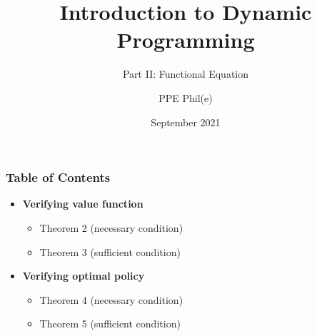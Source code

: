 \documentclass[aspectratio=169]{beamer}
\title[Dynamic Programming Part II] %
{Introduction to Dynamic Programming}
\subtitle{Part II: Functional Equation}
\author[PPE Phil(e)]
{PPE Phil(e)\inst{1}}
\institute[] %
{
  \inst{1}%
  material @ https://github.com/PPEphile
}
\date[2021] %
{September 2021}
\begin{document}
\frame{\titlepage}

\begin{frame}
\frametitle{Table of Contents}
\begin{itemize}
\item \textbf{Verifying \color{magenta} value function}
\begin{itemize}
\item \color{black} Theorem 2 (necessary condition)
\item Theorem 3 (sufficient condition)
\end{itemize}
\item \textbf{Verifying \color{blue}optimal policy}
\begin{itemize}
\item \color{black} Theorem 4 (necessary condition)
\item Theorem 5 (sufficient condition)
\end{itemize}
\end{itemize}
\end{frame}


\begin{frame}

\end{frame}
\end{document}

